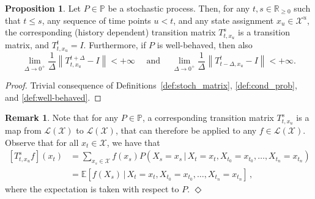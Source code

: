 \documentclass[10pt]{paper}
\theoremstyle{definition}
\newtheorem{proposition}[theorem]{Proposition}
\newtheorem*{remark*}{Remark}
\newcommand{\reals}{\mathbb{R}}
\newcommand{\realsnonneg}{\reals_{\geq 0}}
\newcommand{\states}{\mathcal{X}}
\newcommand{\processes}{\mathbb{P}}
\newcommand{\gambles}{\mathcal{L}}
\newcommand{\gamblesX}{\gambles(\states)}
\newcommand{\norm}[1]{\left\lVert #1 \right\rVert}
\newcommand{\exampleend}{\hfill$\Diamond$}
\begin{document}
\begin{proposition}\label{prop:stochasticprocess:simpleproperties}
Let $P\in\processes$ be a stochastic process. %
Then, for any $t,s\in\realsnonneg$ such that $t\leq s$, any sequence of time points $u<t$, and any state assignment $x_u\in\states^u$, the corresponding (history dependent) transition matrix $T_{t,x_u}^s$ is a transition matrix, and $T_{t,x_u}^t=I$. Furthermore, if $P$ is well-behaved, then also
\begin{equation}\label{eq:wellbehavedtransitionmatrix}%
\lim_{\Delta\to 0^{+}}\frac{1}{\Delta}\norm{T_{t,x_u}^{t+\Delta}-I}<+\infty
\text{~~~~and~~~~}
\lim_{\Delta\to 0^{+}}\frac{1}{\Delta}\norm{T_{t-\Delta,x_u}^t-I}<+\infty.
\end{equation}
\end{proposition}
\begin{proof}
Trivial consequence of Definitions~\ref{def:stoch_matrix}, \ref{def:cond_prob}, and \ref{def:well-behaved}.
\end{proof}

\begin{remark*}
Note that for any $P\in\processes$, a corresponding transition matrix $T_{t, x_u}^s$ is a map from $\gamblesX$ to $\gamblesX$, that can therefore be applied to any $f\in\gamblesX$. Observe that for all $x_t\in\states$, we have that
\begin{align*}
\left[T_{t,x_u}^sf\right](x_t) &= \sum_{x_s\in\states}f(x_s)P(X_s=x_s\,\vert\,X_t=x_t,X_{t_0}=x_{t_0},\ldots,X_{t_n}=x_{t_n})\\
 &= \mathbb{E}\left[f(X_s)\,\vert\,X_t=x_t, X_{t_0}=x_{t_0},\ldots,X_{t_n}=x_{t_n}\right]\,,
\end{align*}
where the expectation is taken with respect to $P$. %
\exampleend
\end{remark*}
\end{document}
